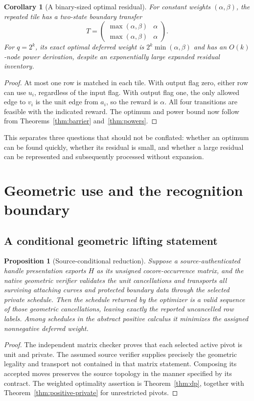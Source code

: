 \documentclass[11pt,a4paper]{article}
\newtheorem{proposition}[theorem]{Proposition}
\newtheorem{corollary}[theorem]{Corollary}
\theoremstyle{definition}
\theoremstyle{remark}
\begin{document}
\begin{corollary}[A binary-sized optimal residual]
For constant weights $(\alpha,\beta)$, the repeated tile has a two-state
boundary transfer
\begin{equation}
 T=\begin{pmatrix}
 \max(\alpha,\beta)&\alpha\\
 \max(\alpha,\beta)&\alpha
 \end{pmatrix}.
 \label{eq:defect-transfer}
\end{equation}
For $q=2^k$, its exact optimal deferred weight is
$2^k\min(\alpha,\beta)$ and has an $O(k)$-node power derivation, despite
an exponentially large expanded residual inventory.
\end{corollary}
\begin{proof}
At most one row is matched in each tile. With output flag zero, either
row can use $u_i$, regardless of the input flag. With output flag one,
the only allowed edge to $v_i$ is the unit edge from $a_i$, so the reward
is $\alpha$. All four transitions are feasible with the indicated reward.
The optimum and power bound now follow from
Theorems~\ref{thm:barrier} and~\ref{thm:powers}.
\end{proof}

This separates three questions that should not be conflated: whether an
optimum can be found quickly, whether its residual is small, and whether
a large residual can be represented and subsequently processed without
expansion.

\section{Geometric use and the recognition boundary}
\label{sec:geometry}

\subsection{A conditional geometric lifting statement}
\begin{proposition}[Source-conditional reduction]
\label{prop:geometry}
Suppose a source-authenticated handle presentation exports $H$ as its
unsigned cocore-occurrence matrix, and the native geometric verifier
validates the unit cancellations and transports all surviving attaching
curves and protected boundary data through the selected private schedule.
Then the schedule returned by the optimizer is a valid sequence of those
geometric cancellations, leaving exactly the reported uncancelled
row labels. Among schedules in the abstract positive calculus it minimizes
the assigned nonnegative deferred weight.
\end{proposition}
\begin{proof}
The independent matrix checker proves that each selected active pivot
is unit and private. The assumed source verifier supplies precisely the
geometric legality and transport not contained in that matrix statement.
Composing its accepted moves preserves the source topology in the manner
specified by its contract. The weighted optimality assertion is
Theorem~\ref{thm:dp}, together with
Theorem~\ref{thm:positive-private} for unrestricted pivots.
\end{proof}
\end{document}
